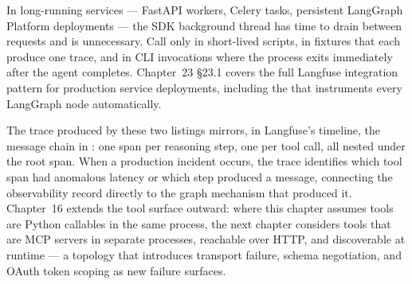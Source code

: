 \begin{tipbox}
In long-running services --- FastAPI workers, Celery tasks, persistent
LangGraph Platform deployments --- the SDK background thread has time to
drain between requests and  is unnecessary. Call
 only in short-lived scripts, in 
fixtures that each produce one trace, and in CLI invocations where the
process exits immediately after the agent completes. Chapter~23 \S23.1
covers the full Langfuse integration pattern for production service
deployments, including the  that instruments
every LangGraph node automatically.
\end{tipbox}

The trace produced by these two listings mirrors, in Langfuse's timeline,
the message chain in : one  span per
 reasoning step, one  per 
tool call, all nested under the  root span. When a
production incident occurs, the trace identifies which tool span had
anomalous latency or which step produced a 
message, connecting the observability record directly to the graph
mechanism that produced it. Chapter~16 extends the tool surface outward:
where this chapter assumes tools are Python callables in the same process,
the next chapter considers tools that are MCP servers in separate
processes, reachable over HTTP, and discoverable at runtime --- a topology
that introduces transport failure, schema negotiation, and OAuth token
scoping as new failure surfaces.
